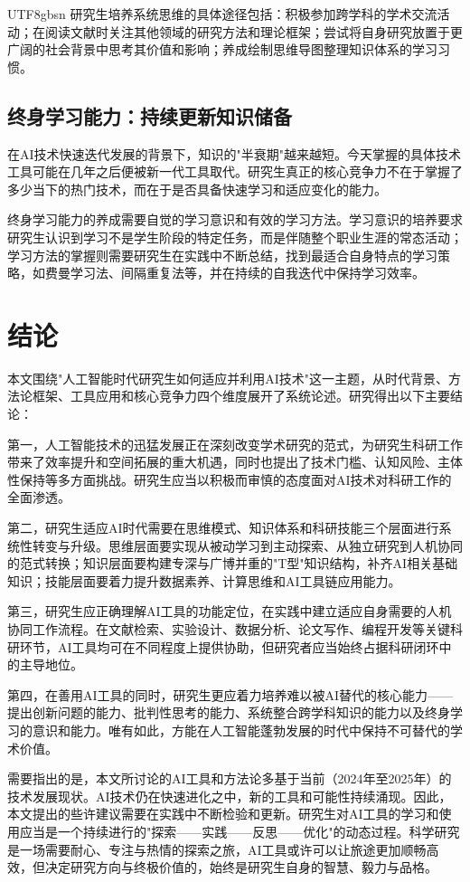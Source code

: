 \documentclass[12pt,a4paper]{article}
\begin{document}
\begin{CJK}{UTF8}{gbsn}
研究生培养系统思维的具体途径包括：积极参加跨学科的学术交流活动；在阅读文献时关注其他领域的研究方法和理论框架；尝试将自身研究放置于更广阔的社会背景中思考其价值和影响；养成绘制思维导图整理知识体系的学习习惯。

\subsection{终身学习能力：持续更新知识储备}

在AI技术快速迭代发展的背景下，知识的"半衰期"越来越短。今天掌握的具体技术工具可能在几年之后便被新一代工具取代。研究生真正的核心竞争力不在于掌握了多少当下的热门技术，而在于是否具备快速学习和适应变化的能力。

终身学习能力的养成需要自觉的学习意识和有效的学习方法。学习意识的培养要求研究生认识到学习不是学生阶段的特定任务，而是伴随整个职业生涯的常态活动；学习方法的掌握则需要研究生在实践中不断总结，找到最适合自身特点的学习策略，如费曼学习法、间隔重复法等，并在持续的自我迭代中保持学习效率。

\section{结论}

本文围绕"人工智能时代研究生如何适应并利用AI技术"这一主题，从时代背景、方法论框架、工具应用和核心竞争力四个维度展开了系统论述。研究得出以下主要结论：

第一，人工智能技术的迅猛发展正在深刻改变学术研究的范式，为研究生科研工作带来了效率提升和空间拓展的重大机遇，同时也提出了技术门槛、认知风险、主体性保持等多方面挑战。研究生应当以积极而审慎的态度面对AI技术对科研工作的全面渗透。

第二，研究生适应AI时代需要在思维模式、知识体系和科研技能三个层面进行系统性转变与升级。思维层面要实现从被动学习到主动探索、从独立研究到人机协同的范式转换；知识层面要构建专深与广博并重的"T型"知识结构，补齐AI相关基础知识；技能层面要着力提升数据素养、计算思维和AI工具链应用能力。

第三，研究生应正确理解AI工具的功能定位，在实践中建立适应自身需要的人机协同工作流程。在文献检索、实验设计、数据分析、论文写作、编程开发等关键科研环节，AI工具均可在不同程度上提供协助，但研究者应当始终占据科研闭环中的主导地位。

第四，在善用AI工具的同时，研究生更应着力培养难以被AI替代的核心能力——提出创新问题的能力、批判性思考的能力、系统整合跨学科知识的能力以及终身学习的意识和能力。唯有如此，方能在人工智能蓬勃发展的时代中保持不可替代的学术价值。

需要指出的是，本文所讨论的AI工具和方法论多基于当前（2024年至2025年）的技术发展现状。AI技术仍在快速进化之中，新的工具和可能性持续涌现。因此，本文提出的些许建议需要在实践中不断检验和更新。研究生对AI工具的学习和使用应当是一个持续进行的"探索——实践——反思——优化"的动态过程。科学研究是一场需要耐心、专注与热情的探索之旅，AI工具或许可以让旅途更加顺畅高效，但决定研究方向与终极价值的，始终是研究生自身的智慧、毅力与品格。


\end{CJK}
\end{document}
